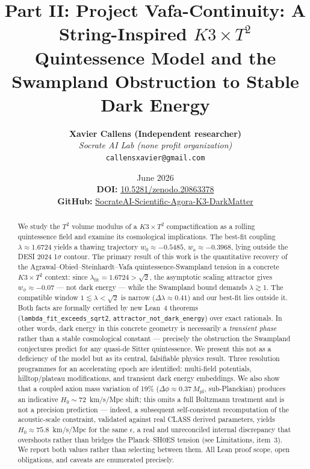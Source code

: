 \documentclass[12pt]{article}
\title{\textbf{Part II: Project Vafa-Continuity: A String-Inspired $K3 \times T^2$ Quintessence Model and the Swampland Obstruction to Stable Dark Energy}}
\author{\textbf{Xavier Callens (Independent researcher)} \\ \textit{Socrate AI Lab (none profit organization)} \\ \texttt{callensxavier@gmail.com}}
\date{June 2026 \\ \vspace{0.5cm} \textbf{DOI:} \href{https://doi.org/10.5281/zenodo.20863378}{10.5281/zenodo.20863378} \\ \textbf{GitHub:} \href{https://github.com/xaviercallens/SocrateAI-Scientific-Agora-K3-DarkMatter}{SocrateAI-Scientific-Agora-K3-DarkMatter}}
\begin{document}
\maketitle

\begin{abstract}
We study the $T^2$ volume modulus of a $K3\times T^2$ compactification as a rolling quintessence field and examine its cosmological implications. The best-fit coupling $\lambda \approx 1.6724$ yields a thawing trajectory $w_0 \approx -0.5485$, $w_a \approx -0.3968$, lying outside the DESI 2024 1$\sigma$ contour. The primary result of this work is the quantitative recovery of the Agrawal--Obied--Steinhardt--Vafa quintessence-Swampland tension in a concrete $K3\times T^2$ context: since $\lambda_\mathrm{fit} = 1.6724 > \sqrt{2}$, the asymptotic scaling attractor gives $w_\phi \approx -0.07$ — not dark energy — while the Swampland bound demands $\lambda \gtrsim 1$. The compatible window $1 \lesssim \lambda < \sqrt{2}$ is narrow ($\Delta\lambda\approx0.41$) and our best-fit lies outside it. Both facts are formally certified by new Lean~4 theorems (\texttt{lambda\_fit\_exceeds\_sqrt2}, \texttt{attractor\_not\_dark\_energy}) over exact rationals. In other words, dark energy in this concrete geometry is necessarily a \emph{transient phase} rather than a stable cosmological constant --- precisely the obstruction the Swampland conjectures predict for any quasi-de Sitter quintessence. We present this not as a deficiency of the model but as its central, falsifiable physics result. Three resolution programmes for an accelerating epoch are identified: multi-field potentials, hilltop/plateau modifications, and transient dark energy embeddings. We also show that a coupled axion mass variation of 19\% ($\Delta\phi\approx0.37\,M_\mathrm{pl}$, sub-Planckian) produces an indicative $H_0\sim72$~km/s/Mpc shift; this omits a full Boltzmann treatment and is not a precision prediction — indeed, a subsequent self-consistent recomputation of the acoustic-scale constraint, validated against real CLASS derived parameters, yields $H_0\approx75.8$~km/s/Mpc for the same $\epsilon$, a real and unreconciled internal discrepancy that overshoots rather than bridges the Planck--SH0ES tension (see Limitations, item~3). We report both values rather than selecting between them. All Lean proof scope, open obligations, and caveats are enumerated precisely.
\end{abstract}
\end{document}
